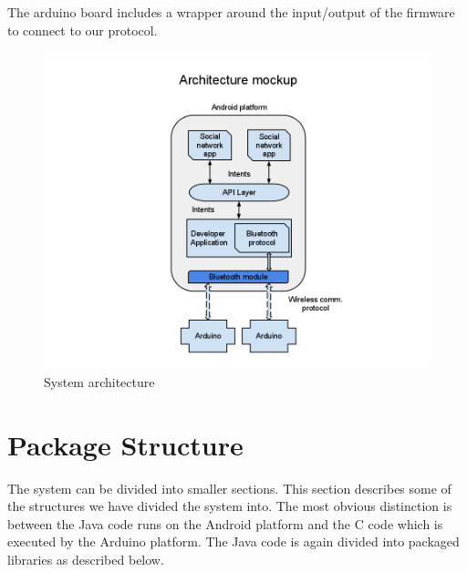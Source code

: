 The arduino board includes a wrapper around the input/output of the firmware to connect to our protocol.
\begin{figure}[hb!]
\centering \includegraphics[scale=0.40]{img/architecture-diagram.png}
\caption{System architecture}
\label{fig:architecture-diagram}
\end{figure}

\section{Package Structure}
The system can be divided into smaller sections. This section describes some of the structures
we have divided the system into. The most obvious distinction is between the Java code runs
on the Android platform and the C code which is executed by the Arduino platform.
The Java code is again divided into packaged libraries as described below.

